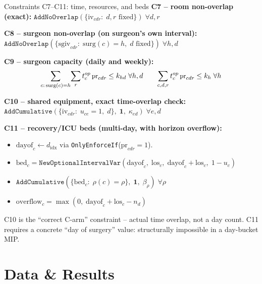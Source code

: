 \documentclass[10pt,aspectratio=169]{beamer}
\begin{document}
\begin{frame}{Constraints C7--C11: time, resources, and beds}
  \textbf{C7 -- room non-overlap (exact):}\quad
  $\texttt{AddNoOverlap}(\{\text{iv}_{cdr}:\;d,r\text{ fixed}\})\;\forall d,r$

  \smallskip
  \textbf{C8 -- surgeon non-overlap (on surgeon's own interval):}\quad
  $\texttt{AddNoOverlap}(\{\text{sgiv}_{cdr}:\;\text{surg}(c)=h,\;d\text{ fixed}\})\;\forall h,d$

  \smallskip
  \textbf{C9 -- surgeon capacity (daily and weekly):}
  \[\small
    \sum_{c:\,\text{surg}(c)=h}\!\sum_r t_c^{op}\,\text{pr}_{cdr}\le k_{hd}\;\forall h,d
    \qquad
    \sum_{c,d,r} t_c^{op}\,\text{pr}_{cdr}\le k_h\;\forall h
  \]

  \textbf{C10 -- shared equipment, exact time-overlap check:}\quad
  $\texttt{AddCumulative}(\{\text{iv}_{cdr}:\;u_{ce}=1,\;d\},\;\mathbf{1},\;\kappa_{ed})\;\forall e,d$

  \textbf{C11 -- recovery/ICU beds (multi-day, with horizon overflow):}
  \begin{itemize}\footnotesize
    \item $\text{dayof}_c\leftarrow d_\text{idx}$
      via \texttt{OnlyEnforceIf}($\text{pr}_{cdr}=1$).
    \item $\text{bed}_c=\texttt{NewOptionalIntervalVar}
      (\text{dayof}_c,\;\text{los}_c,\;\text{dayof}_c+\text{los}_c,\;1-u_c)$
    \item $\texttt{AddCumulative}(\{\text{bed}_c:\;\rho(c)=\rho\},\;\mathbf{1},\;\beta_\rho)
      \;\forall\rho$
    \item $\text{overflow}_c=\max(0,\;\text{dayof}_c+\text{los}_c-n_d)$
  \end{itemize}
  \footnotesize C10 is the ``correct C-arm'' constraint -- actual time
  overlap, not a day count. C11 requires a concrete ``day of surgery''
  value: structurally impossible in a day-bucket MIP.
\end{frame}

\section{Data \& Results}
\end{document}
